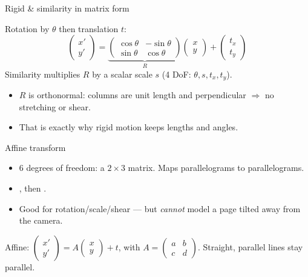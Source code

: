 \documentclass[10pt,aspectratio=169]{beamer}
\begin{document}
\begin{frame}{Rigid \& similarity in matrix form}
  \begin{mathbox}
    Rotation by $\theta$ then translation $t$:
    \[
      \begin{pmatrix}x'\\y'\end{pmatrix}=
      \underbrace{\begin{pmatrix}\cos\theta & -\sin\theta\\ \sin\theta & \cos\theta\end{pmatrix}}_{R}
      \begin{pmatrix}x\\y\end{pmatrix}+\begin{pmatrix}t_x\\t_y\end{pmatrix}
    \]
    Similarity multiplies $R$ by a scalar scale $s$ (4 DoF: $\theta, s, t_x, t_y$).
  \end{mathbox}
  \begin{itemize}
    \item $R$ is orthonormal: columns are unit length and perpendicular $\Rightarrow$ no stretching or shear.
    \item That is exactly why rigid motion keeps lengths and angles.
  \end{itemize}
\end{frame}

\begin{frame}{Affine transform}
  \begin{itemize}
    \item 6 degrees of freedom: a $2\times3$ matrix. Maps parallelograms to parallelograms.
    \item {}, then .
    \item Good for rotation/scale/shear — but \emph{cannot} model a page tilted away from the camera.
  \end{itemize}
  \begin{mathbox}
    Affine: $\begin{pmatrix}x'\\y'\end{pmatrix} = A\begin{pmatrix}x\\y\end{pmatrix} + t$,
    with $A=\begin{pmatrix}a&b\\c&d\end{pmatrix}$. Straight, parallel lines stay parallel.
  \end{mathbox}
\end{frame}
\end{document}
